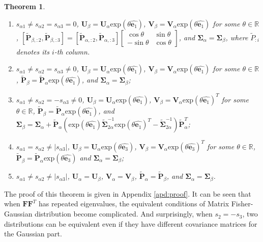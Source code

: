 \documentclass[12pt]{article}
\newtheorem{theorem}{Theorem}
\begin{document}
\begin{theorem}
\begin{enumerate}
		\item $s_{\alpha 1}\neq s_{\alpha 2}=s_{\alpha 3}=0$, $\mathbf{U}_\beta=\mathbf{U}_\alpha\mathrm{exp}(\theta\hat{\bm{e}_1})$, $\mathbf{V}_\beta=\mathbf{V}_\alpha\mathrm{exp}(\theta\hat{\bm{e}_1})$ for some $\theta\in\mathbb{R}$, $[\tilde{\mathbf{P}}_{\beta, :2}, \tilde{\mathbf{P}}_{\beta, :3}] = [\tilde{\mathbf{P}}_{\alpha, :2}, \tilde{\mathbf{P}}_{\alpha, :3}]\begin{bmatrix}\cos\theta&\sin\theta\\-\sin\theta&\cos\theta\end{bmatrix}$, and $\mathbf{\Sigma}_\alpha=\mathbf{\Sigma}_\beta$, where $\tilde{P}_{:i}$ denotes its $i$-th column.
		\item $s_{\alpha 1}\neq s_{\alpha 2}=s_{\alpha 3}\neq 0$, $\mathbf{U}_\beta=\mathbf{U}_\alpha\mathrm{exp}(\theta\hat{\bm{e}_1})$, $\mathbf{V}_\beta=\mathbf{V}_\alpha\mathrm{exp}(\theta\hat{\bm{e}_1})$ for some $\theta\in\mathbb{R}$, $\tilde{\mathbf{P}}_\beta=\tilde{\mathbf{P}}_\alpha\mathrm{exp}(\theta\hat{\bm{e}_1})$, and $\mathbf{\Sigma}_\alpha=\mathbf{\Sigma}_\beta$;
		\item $s_{\alpha 1}\neq s_{\alpha 2}=-s_{\alpha 3}\neq 0$, $\mathbf{U}_\beta=\mathbf{U}_\alpha\mathrm{exp}(\theta\hat{\bm{e}_1})$, $\mathbf{V}_\beta=\mathbf{V}_\alpha\mathrm{exp}(\theta\hat{\bm{e}_1})^T$ for some $\theta\in\mathbb{R}$, $\tilde{\mathbf{P}}_\beta=\tilde{\mathbf{P}}_\alpha\mathrm{exp}(\theta\hat{\bm{e}_1})$, and $\mathbf{\Sigma}_\beta=\mathbf{\Sigma}_\alpha+\tilde{\mathbf{P}}_\alpha\left(\mathrm{exp}(\theta\hat{\bm{e}_1})\tilde{\mathbf{\Sigma}}_{2\alpha}^{-1}\mathrm{exp}(\theta\hat{\bm{e}_1})^T-\tilde{\mathbf{\Sigma}}_{2\alpha}^{-1}\right)\tilde{\mathbf{P}}_\alpha^T$;
		\item $s_{\alpha 1}=s_{\alpha 2}\neq|s_{\alpha 3}|$, $\mathbf{U}_\beta=\mathbf{U}_\alpha\mathrm{exp}(\theta\hat{\bm{e}_3})$, $\mathbf{V}_\beta=\mathbf{V}_\alpha\mathrm{exp}(\theta\hat{\bm{e}_3})^T$ for some $\theta\in\mathbb{R}$, $\tilde{\mathbf{P}}_\beta=\tilde{\mathbf{P}}_\alpha\mathrm{exp}(\theta\hat{\bm{e}_3})$ and $\mathbf{\Sigma}_\alpha=\mathbf{\Sigma}_\beta$;
		\item $s_{\alpha 1}\neq s_{\alpha 2}\neq |s_{\alpha 3}|$, $\mathbf{U}_\alpha=\mathbf{U}_\beta$, $\mathbf{V}_\alpha=\mathbf{V}_\beta$, $\tilde{\mathbf{P}}_\alpha=\tilde{\mathbf{P}}_\beta$, and $\mathbf{\Sigma}_\alpha=\mathbf{\Sigma}_\beta$.
	\end{enumerate}
\end{theorem}
The proof of this theorem is given in Appendix \ref{apd:proof}.
It can be seen that when $\mathbf{F}\mathbf{F}^T$ has repeated eigenvalues, the equivalent conditions of Matrix Fisher-Gaussian distribution become complicated.
And surprisingly, when $s_2=-s_3$, two distributions can be equivalent even if they have different covariance matrices for the Gaussian part.
\end{document}
